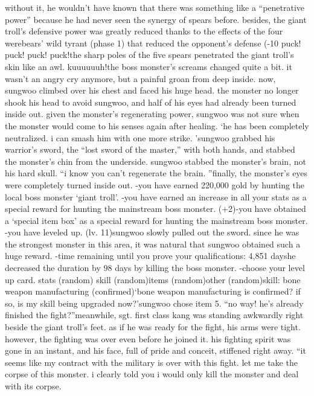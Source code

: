 without it, he wouldn’t have known that there was something like a “penetrative power” because he had never seen the synergy of spears before.
besides, the giant troll’s defensive power was greatly reduced thanks to the effects of the four werebears’ wild tyrant (phase 1) that reduced the opponent’s defense (-10%
puck! puck! puck! puck!the sharp poles of the five spears penetrated the giant troll’s skin like an awl.
kuuuuuuh!the boss monster’s screams changed quite a bit.
 it wasn’t an angry cry anymore, but a painful groan from deep inside.
now, sungwoo climbed over his chest and faced his huge head.
 the monster no longer shook his head to avoid sungwoo, and half of his eyes had already been turned inside out.
given the monster’s regenerating power, sungwoo was not sure when the monster would come to his senses again after healing.
‘he has been completely neutralized.
 i can smash him with one more strike.
’sungwoo grabbed his warrior’s sword, the “lost sword of the master,” with both hands, and stabbed the monster’s chin from the underside.
sungwoo stabbed the monster’s brain, not his hard skull.
“i know you can’t regenerate the brain.
”finally, the monster’s eyes were completely turned inside out.
-you have earned 220,000 gold by hunting the local boss monster ‘giant troll’.
-you have earned an increase in all your stats as a special reward for hunting the mainstream boss monster.
 (+2)-you have obtained a ‘special item box’ as a special reward for hunting the mainstream boss monster.
-you have leveled up.
 (lv.
 11)sungwoo slowly pulled out the sword.
 since he was the strongest monster in this area, it was natural that sungwoo obtained such a huge reward.
-time remaining until you prove your qualifications: 4,851 dayshe decreased the duration by 98 days by killing the boss monster.
-choose your level up card.
stats (random)
skill (random)items (random)other (random)skill: bone weapon manufacturing (confirmed)‘bone weapon manufacturing is confirmed? if so, is my skill being upgraded now?’sungwoo chose item 5.
“no way! he’s already finished the fight?”meanwhile, sgt.
 first class kang was standing awkwardly right beside the giant troll’s feet.
as if he was ready for the fight, his arms were tight.
however, the fighting was over even before he joined it.
 his fighting spirit was gone in an instant, and his face, full of pride and conceit, stiffened right away.
“it seems like my contract with the military is over with this fight.
 let me take the corpse of this monster.
 i clearly told you i would only kill the monster and deal with its corpse.

